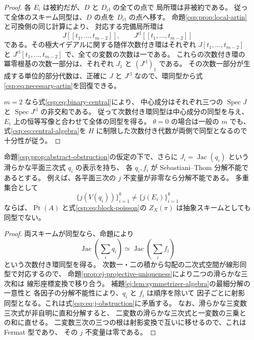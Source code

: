 \begin{proof}
各 $E_i$ は被約だが、$D$ と $D_{\mathrm{cl}}$ の全ての点で
局所環は非被約である。
従って全体のスキーム同型は、$D$ の点を $D_{\mathrm{cl}}$ の点へ移す。
命題\ref{csp:prop:local-artin}と可換側の同じ計算により、
対応する完備局所環は
\[
 J[[t_1,\ldots,t_{m-2}]],\qquad
 J^{\mathrm{cl}}[[t_1,\ldots,t_{m-2}]]
\]
である。その極大イデアルに関する随伴次数付き環はそれぞれ
$J[t_1,\ldots,t_{m-2}]$ と
$J^{\mathrm{cl}}[t_1,\ldots,t_{m-2}]$ で、全ての変数の次数は一である。
これらの次数付き環の冪零根基の次数一部分は、それぞれ $J_1$ と
$(J^{\mathrm{cl}})_1$ である。
その次数一部分が生成する単位的部分代数は、正確に $J$ と
$J^{\mathrm{cl}}$ なので、環同型から式\eqref{csp:eq:necessary-artin}を回復できる。

$m=2$ なら式\eqref{csp:eq:binary-central}により、
中心成分はそれぞれ三つの $\operatorname{Spec}J$ と
$\operatorname{Spec}J^{\mathrm{cl}}$ の非交和である。
従って次数付き環同型は中心成分の同型を与え、
$E_i$ 上の恒等写像と合わせて全体の同型を得る。
$\theta=0$ の場合は一般の $m$ でも、式\eqref{csp:eq:central-algebra}を
$H$ に制限した次数付き代数が両側で同型となるので十分性が従う。
\end{proof}

\begin{corollary}
\label{csp:cor:block-j-obstruction}
命題\ref{csp:prop:abstract-obstruction}の仮定の下で、さらに
$J_i=\operatorname{Jac}(q_i)$ という滑らかな平面三次式 $q_i$ の表示を持ち、
各 $q_i,f_i$ が Sebastiani--Thom 分解不能であるとする。
例えば、各平面三次の $j$ 不変量が非零なら分解不能である。
多重集合として
\begin{equation}\label{csp:eq:j-obstruction}
 \{j(V(q_i))\}_{i=1}^k\ne\{j(E_i)\}_{i=1}^k
\end{equation}
ならば、$\operatorname{Pt}(A)$ と式\eqref{csp:eq:block-poisson}の
$Z_X(\pi)$ は抽象スキームとしても同型でない。
\end{corollary}

\begin{proof}
両スキームが同型なら、命題により
\[
 \operatorname{Jac}\left(\sum_iq_i\right)
       \simeq\operatorname{Jac}\left(\sum_if_i\right)
\]
という次数付き環同型を得る。
次数一・二の積から勾配の二次式空間が線形同型で対応するので、
命題\ref{prop:ej-projective-uniqueness}により二つの滑らかな三次和は
線形座標変換で移り合う。
補題\ref{ej:lem:symmetrizer-algebra}の最細分解の一意性と
各因子の分解不能性により、$q_i$ と $f_i$ は順序を除いて
因子ごとに射影同型となる。これは式\eqref{csp:eq:j-obstruction}に矛盾する。
なお、滑らかな三変数三次式が非自明に直和分解すると、
二変数の滑らかな三次式と一変数の三乗との和に直せる。
二変数三次の三つの根は射影変換で互いに移せるので、これは Fermat 型であり、
その $j$ 不変量は零である。
\end{proof}

